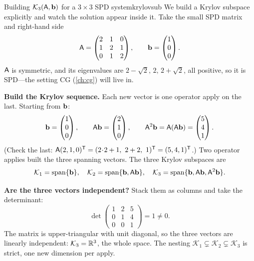 \begin{workedexample}{Building $\mathcal{K}_3(\mathsf{A},\mathbf{b})$ for a $3\times3$ SPD
system}{krylovsub}
We build a Krylov subspace explicitly and watch the solution appear inside it. Take
the small SPD matrix and right-hand side
\[
  \mathsf{A}=\begin{pmatrix}2&1&0\\1&2&1\\0&1&2\end{pmatrix},
  \qquad
  \mathbf{b}=\begin{pmatrix}1\\0\\0\end{pmatrix}.
\]
$\mathsf{A}$ is symmetric, and its eigenvalues are $2-\sqrt2,\,2,\,2+\sqrt2$, all
positive, so it is SPD---the setting CG (\cref{ch:cg}) will live in.

\textbf{Build the Krylov sequence.} Each new vector is one operator apply on the
last. Starting from $\mathbf{b}$:
\[
  \mathbf{b}=\begin{pmatrix}1\\0\\0\end{pmatrix},\qquad
  \mathsf{A}\mathbf{b}=\begin{pmatrix}2\\1\\0\end{pmatrix},\qquad
  \mathsf{A}^2\mathbf{b}=\mathsf{A}(\mathsf{A}\mathbf{b})=\begin{pmatrix}5\\4\\1\end{pmatrix}.
\]
(Check the last: $\mathsf{A}(2,1,0)^{\mathsf T}=(2\!\cdot\!2+1,\ 2+2,\ 1)^{\mathsf
T}=(5,4,1)^{\mathsf T}$.) Two operator applies built the three spanning vectors. The
three Krylov subspaces are
\[
  \mathcal{K}_1=\operatorname{span}\{\mathbf{b}\},\quad
  \mathcal{K}_2=\operatorname{span}\{\mathbf{b},\mathsf{A}\mathbf{b}\},\quad
  \mathcal{K}_3=\operatorname{span}\{\mathbf{b},\mathsf{A}\mathbf{b},\mathsf{A}^2\mathbf{b}\}.
\]

\tcblower
\textbf{Are the three vectors independent?} Stack them as columns and take the
determinant:
\[
  \det\!\begin{pmatrix}1&2&5\\0&1&4\\0&0&1\end{pmatrix}=1\neq0 .
\]
The matrix is upper-triangular with unit diagonal, so the three vectors are linearly
independent: $\mathcal{K}_3=\mathbb{R}^3$, the whole space. The nesting
$\mathcal{K}_1\subsetneq\mathcal{K}_2\subsetneq\mathcal{K}_3$ is strict, one new
dimension per apply.


\end{workedexample}
